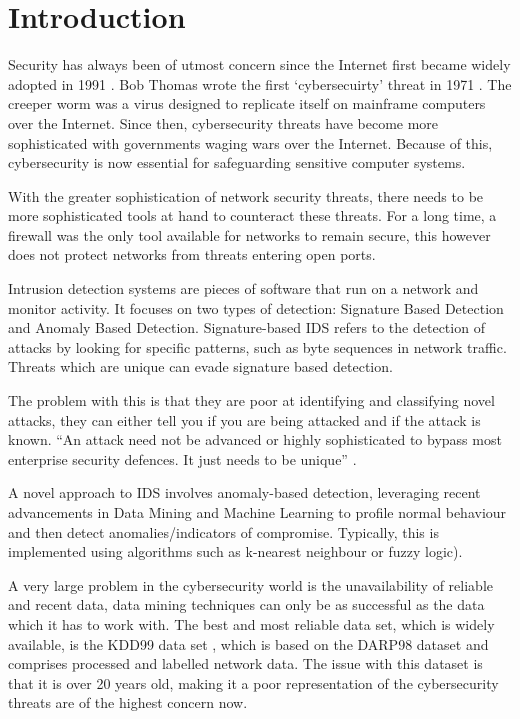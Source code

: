 \chapter{Introduction}
Security has always been of utmost concern since the Internet first became widely adopted in 1991 \cite{www}. Bob Thomas wrote the first ‘cybersecuirty’ threat in 1971 \cite{compvir}. The creeper worm was a virus designed to replicate itself on mainframe computers over the Internet. Since then, cybersecurity threats have become more sophisticated with governments waging wars over the Internet. Because of this, cybersecurity is now essential for safeguarding sensitive computer systems.

With the greater sophistication of network security threats, there needs to be more sophisticated tools at hand to counteract these threats. For a long time, a firewall was the only tool available for networks to remain secure, this however does not protect networks from threats entering open ports. 

Intrusion detection systems are pieces of software that run on a network and monitor activity. It focuses on two types of detection: Signature Based Detection and Anomaly Based Detection. Signature-based IDS refers to the detection of attacks by looking for specific patterns, such as byte sequences in network traffic. Threats which are unique can evade signature based detection.

The problem with this is that they are poor at identifying and classifying novel attacks, they can either tell you if you are being attacked and if the attack is known. “An attack need not be advanced or highly sophisticated to bypass most enterprise security defences. It just needs to be unique” \cite{avetco}.

A novel approach to IDS involves anomaly-based detection, leveraging recent advancements in Data Mining and Machine Learning to profile normal behaviour and then detect anomalies/indicators of compromise. Typically, this is implemented using algorithms such as k-nearest neighbour or fuzzy logic). 

A very large problem in the cybersecurity world is the unavailability of reliable and recent data, data mining techniques can only be as successful as the data which it has to work with. The best and most reliable data set, which is widely available, is the KDD99 data set \cite{kd99ds}, which is based on the DARP98 dataset and comprises processed and labelled network data. The issue with this dataset is that it is over 20 years old, making it a poor representation of the cybersecurity threats are of the highest concern now. 

